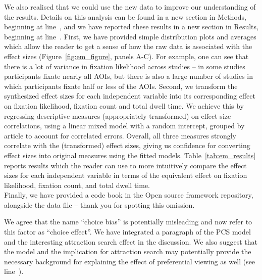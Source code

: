 We also realised that we could use the new data to improve our understanding of the results. Details on this analysis can be found in a new section in Methods, beginning at line~, and we have reported these results in a new section in Results, beginning at line~.
First, we have provided simple distribution plots and averages which allow the reader to get a sense of how the raw data is associated with the effect sizes (Figure~\ref{fig:em_figure}, panels A-C). For example, one can see that there is a lot of variance in fixation likelihood across studies -- in some studies participants fixate nearly all AOIs, but there is also a large number of studies in which participants fixate half or less of the AOIs. Second, we transform the synthesized effect sizes for each independent variable into its corresponding effect on fixation likelihood, fixation count and total dwell time. We achieve this by regressing descriptive measures (appropriately transformed) on effect size correlations, using a linear mixed model with a random intercept, grouped by article to account for correlated errors. Overall, all three measures strongly correlate with the (transformed) effect sizes, giving us confidence for converting effect sizes into original measures using the fitted models. Table~\ref{tab:em_results} reports results which the reader can use to more intuitively compare the effect sizes for each independent variable in terms of the equivalent effect on fixation likelihood, fixation count, and total dwell time.\\

Finally, we have provided a code book in the Open source framework repository, alongside the data file -- thank you for spotting this omission.



We agree that the name ``choice bias'' is potentially misleading and now refer to this factor as ``choice effect''. We have integrated a paragraph of the PCS model and the interesting attraction search effect in the discussion. We also suggest that the model and the implication for attraction search may potentially provide the necessary background for explaining the effect of preferential viewing  as well (see line~).  


